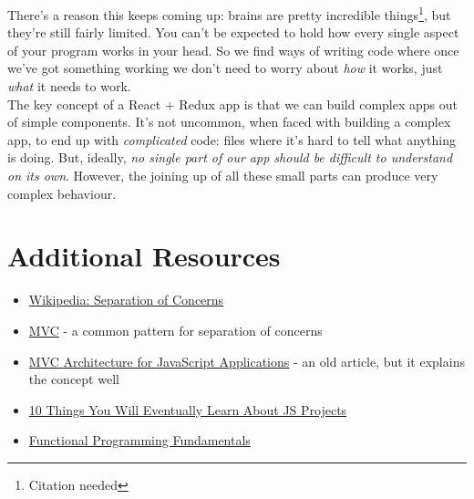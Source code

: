 There's a reason this keeps coming up: brains are pretty incredible things\footnote{Citation needed}, but they're still fairly limited. You can't be expected to hold how every single aspect of your program works in your head. So we find ways of writing code where once we've got something working we don't need to worry about \textit{how} it works, just \textit{what} it needs to work.
\\

The key concept of a React + Redux app is that we can build complex apps out of simple components. It's not uncommon, when faced with building a complex app, to end up with \textit{complicated} code: files where it's hard to tell what anything is doing. But, ideally, \textit{no single part of our app should be difficult to understand on its own}. However, the joining up of all these small parts can produce very complex behaviour.



\pagebreak

\section{Additional Resources}

\begin{itemize}[leftmargin=*]
    \item \href{https://en.wikipedia.org/wiki/Separation_of_concerns}{Wikipedia: Separation of Concerns}
    \item \href{https://en.wikipedia.org/wiki/Model–view–controller}{MVC} - a common pattern for separation of concerns
    \item \href{http://peter.michaux.ca/articles/mvc-architecture-for-javascript-applications}{MVC Architecture for JavaScript Applications} - an old article, but it explains the concept well
    \item \href{https://blog.usejournal.com/10-things-you-will-eventually-learn-about-javascript-projects-efd7646b958a}{10 Things You Will Eventually Learn About JS Projects}
    \item \href{https://www.matthewgerstman.com/functional-programming-fundamentals/}{Functional Programming Fundamentals}
\end{itemize}
